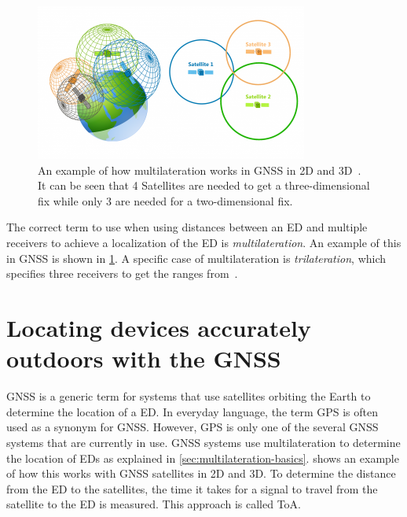 \begin{figure}[htbp]
    \centering
    \includegraphics[width=0.8\textwidth]{pictures/multilateration/gps_multilateration.png}
    \caption{
        An example of how multilateration works in \ac{GNSS} in 2D and 3D~\protect\cite{gisgeography_how_2018}.
        It can be seen that 4 Satellites are needed to get a three-dimensional fix while only 3 are needed for a two-dimensional fix.
    }\label{pic:multilateration-gps-2d-3d-example}
\end{figure}

The correct term to use when using distances between an \acl{ED} and multiple receivers to achieve a localization of the \acl{ED} is \emph{multilateration}.
An example of this in \ac{GNSS} is shown in \cref{pic:multilateration-gps-2d-3d-example}.
A specific case of multilateration is \emph{trilateration}, which specifies three receivers to get the ranges from~\cite{ruiz_efficient_2013}.

\section{Locating devices accurately outdoors with the \acl{GNSS}}

\ac{GNSS} is a generic term for systems that use satellites orbiting the Earth to determine the location of a \acl{ED}.
In everyday language, the term \ac{GPS} is often used as a synonym for \ac{GNSS}.
However, \ac{GPS} is only one of the several \ac{GNSS} systems that are currently in use.
\ac{GNSS} systems use multilateration to determine the location of \aclp{ED} as explained in \cref{sec:multilateration-basics}.
 shows an example of how this works with \ac{GNSS} satellites in 2D and 3D.
To determine the distance from the \acl{ED} to the satellites, the time it takes for a signal to travel from the satellite to the \acl{ED} is measured.
This approach is called \acf{ToA}.

